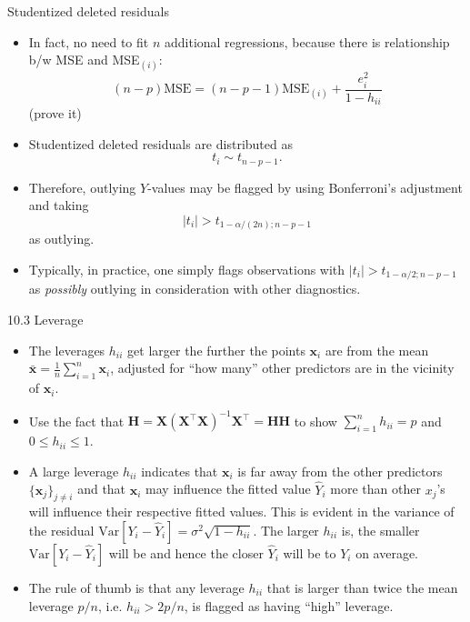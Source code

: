 \documentclass{beamer}
\newcommand{\Var}{\mathrm{Var}}
\begin{document}
\begin{frame}{Studentized deleted residuals}
\begin{itemize}
\item In fact, no need to fit $n$ additional regressions, because there is relationship b/w MSE and MSE$_{(i)}$:
$$
(n-p)\text{MSE}=(n-p-1)\text{MSE}_{(i)}+\frac{e_i^2}{1-h_{ii}}
$$
(prove it)

\item\pause Studentized deleted residuals are distributed as
$$
t_i\sim t_{n-p-1}.
$$
\item\pause Therefore, outlying $Y$-values may be flagged by using Bonferroni's adjustment and taking
$$
|t_i|>t_{1-\alpha/(2n); n-p-1}
$$
as outlying.
\item\pause Typically, in practice, one simply flags observations with $|t_i|>t_{1-\alpha/2; n-p-1}$ as \textit{possibly} outlying in consideration with other diagnostics.
\end{itemize}
\end{frame}

\begin{frame}{10.3 Leverage}
\begin{itemize}
\item The leverages $h_{ii}$ get larger the further the points $\mathbf{x}_i$ are from the mean $\bar{\mathbf{x}} = \frac1n\sum_{i=1}^n\mathbf{x}_i$, adjusted for ``how many'' other
predictors are in the vicinity of $\mathbf{x}_i$.
\item\pause Use the fact that $\mathbf{H} = \mathbf{X}(\mathbf{X}^\top\mathbf{X})^{-1}\mathbf{X}^\top = \mathbf{HH}$ to show $\sum_{i=1}^n h_{ii} = p$ and $0 \le h_{ii} \le1$.
\item\pause A large leverage $h_{ii}$ indicates that $\mathbf{x}_i$ is far away from the other predictors $\{\mathbf{x}_j\}_{j\ne i}$ \pause and that $\mathbf{x}_i$ may influence the fitted value $\hat{Y}_i$ more than other $x_j$'s will influence their respective fitted values. \pause This is evident in the variance of the residual $\Var[Y_i - \hat{Y}_i] = \sigma^2 \sqrt{1 - h_{ii}}$. The larger $h_{ii}$ is, the smaller
$\Var[Y_i - \hat{Y}_i]$ will be and hence the closer $\hat{Y}_i$ will be to $Y_i$ on average.
\item\pause The rule of thumb is that any leverage $h_{ii}$ that is larger than
twice the mean leverage $p/n$, i.e. $h_{ii} > 2p/n$, is flagged as
having ``high'' leverage.
\end{itemize}
\end{frame}
\end{document}
